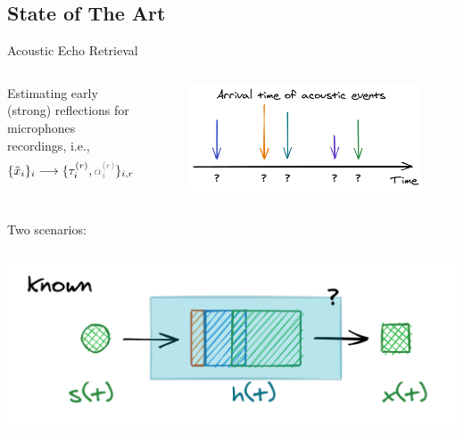 \subsection*{State of The Art}

\begin{frame}[t]{Acoustic Echo Retrieval \hfill\faBook}
    \begin{columns}[T,onlytextwidth]
            Estimating early (strong) reflections for microphones recordings, i.e.,
            \begin{equation*}
                \{\contMic_i\}_i \longrightarrow \{ \tauir, \textcolor{gray}{\ampir} \}_{i,r}
            \end{equation*}
            \begin{figure}
                \centering
                \includegraphics[width=\textwidth]{./figures/arrivals.png}
            \end{figure}
    \end{columns}

    \pause
    \begin{block}{Two scenarios:}

    \begin{columns}[onlytextwidth]
        \centering
        \includegraphics[width=.9\textwidth]{./figures/active.png}


\end{columns}
\end{block}
\end{frame}
